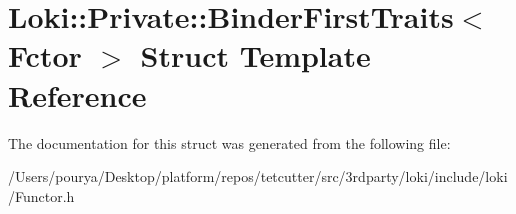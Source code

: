 \hypertarget{structLoki_1_1Private_1_1BinderFirstTraits}{}\section{Loki\+:\+:Private\+:\+:Binder\+First\+Traits$<$ Fctor $>$ Struct Template Reference}
\label{structLoki_1_1Private_1_1BinderFirstTraits}


The documentation for this struct was generated from the following file\+:\begin{DoxyCompactItemize}
\item 
/\+Users/pourya/\+Desktop/platform/repos/tetcutter/src/3rdparty/loki/include/loki/Functor.\+h\end{DoxyCompactItemize}
